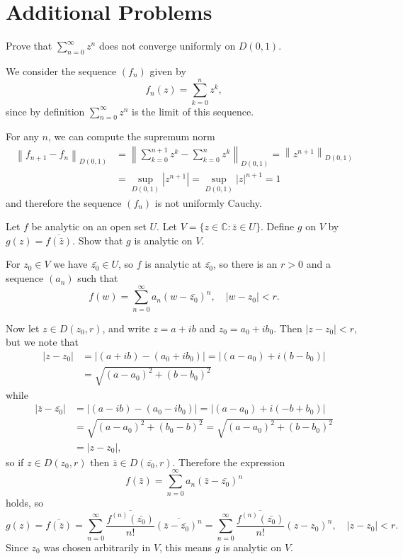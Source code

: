 \documentclass{article}
\newcounter{Problem}
\newenvironment{Problem}{\begin{Exercise}[name={Problem},
                                          counter={Problem}]}
                        {\end{Exercise}}
\begin{document}
\section{Additional Problems}

\begin{Problem}
  Prove that $\sum_{n=0}^\infty z^n$ does not converge uniformly on
  $D(0, 1)$.
\end{Problem}

\begin{Answer}
  We consider the sequence $(f_n)$ given by
  $$
  f_n(z) = \sum_{k=0}^n z^k,
  $$
  since by definition $\sum_{n=0}^\infty z^n$ is the limit
  of this sequence.

  For any $n$, we can compute the supremum norm
  \begin{align*}
    \left\|
      f_{n+1} - f_n
    \right\|_{D(0,1)}
  &=
    \left\|
      \sum_{k=0}^{n+1} z^k
    - \sum_{k=0}^{n} z^k
    \right\|_{D(0,1)}
   =
  \left\|
    z^{n+1}
  \right\|_{D(0,1)} \\
  &=
  \sup_{D(0,1)} |z^{n+1}|
   =
  \sup_{D(0,1)} |z|^{n+1}
   = 1
  \end{align*}
  and therefore the sequence $(f_n)$ is not uniformly
  Cauchy.
\end{Answer}

\begin{Problem}
  Let $f$ be analytic on an open set $U$. Let
  $V = \{ z \in \mathbb{C} : \bar{z} \in U \}$. Define $g$ on $V$ by
  $g(z) = \overline{f(\bar{z})}$. Show that $g$ is analytic on $V$.
\end{Problem}

\begin{Answer}
For $z_0 \in V$ we have $\bar{z_0} \in U$, so
$f$ is analytic at $\bar{z_0}$, so there is an
$r > 0$ and a sequence $(a_n)$ such that
$$
  f(w)
= \sum_{n=0}^\infty a_n(w - \bar{z_0})^n, \quad
  |w - z_0| < r.
$$

Now let $z \in D(z_0, r)$, and write $z = a + ib$ and
$z_0 = a_0 + ib_0$. Then $|z - z_0| < r$, but we note that
\begin{align*}
  |z - z_0|
&= |(a + ib) - (a_0 + ib_0)|
 = |(a - a_0) + i(b - b_0)| \\
&= \sqrt{(a - a_0)^2 + (b - b_0)^2}
\end{align*}
while
\begin{align*}
  |\bar{z} - \bar{z_0}|
&= |(a - ib) - (a_0 - ib_0)|
 = |(a - a_0) + i(-b + b_0)| \\
&= \sqrt{(a - a_0)^2 + (b_0 - b)^2}
 = \sqrt{(a - a_0)^2 + (b - b_0)^2} \\
&= |z - z_0|,
\end{align*}
so if $z \in D(z_0, r)$ then $\bar{z} \in D(\bar{z_0}, r)$. Therefore
the expression
$$
f(\bar{z})
= \sum_{n=0}^\infty a_n (\bar{z} - \bar{z_0})^n
$$
holds, so
$$
  g(z)
= \overline{f(\bar{z})}
= \sum_{n=0}^\infty \frac{\overline{f^{(n)}(\bar{z_0})}}{n!}
                 \overline{(\bar{z} - \bar{z_0})^n}
= \sum_{n=0}^\infty \frac{\overline{f^{(n)}(\bar{z_0})}}{n!}
                 (z - z_0)^n, \quad
|z - z_0| < r.
$$
Since $z_0$ was chosen arbitrarily
in $V$, this means $g$ is analytic on $V$.
\end{Answer}
\end{document}
